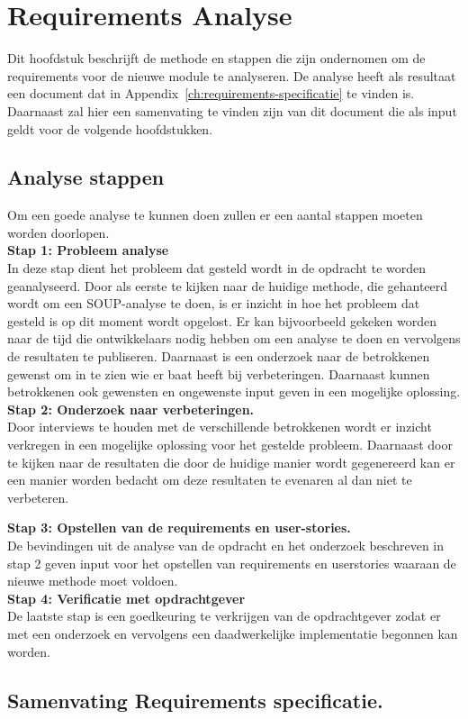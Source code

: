 
\chapter{Requirements Analyse}\label{ch:requirements-analyse}
Dit hoofdstuk beschrijft de methode en stappen die zijn ondernomen om de requirements voor de nieuwe module te analyseren. De analyse heeft als resultaat een document dat in Appendix~\ref{ch:requirements-specificatie} te vinden is. Daarnaast zal hier een samenvating te vinden zijn van dit document die als input geldt voor de volgende hoofdstukken.

\section{Analyse stappen}\label{sec:analyse-stappen}
Om een goede analyse te kunnen doen zullen er een aantal stappen  moeten worden doorlopen.\\
\textbf{Stap 1: Probleem analyse}\\
In deze stap dient het probleem dat gesteld wordt in de opdracht te worden geanalyseerd. Door als eerste te kijken naar de huidige methode, die gehanteerd wordt om een SOUP-analyse te doen, is er inzicht in hoe het probleem dat gesteld is op dit moment wordt opgelost. Er kan bijvoorbeeld gekeken worden naar de tijd die ontwikkelaars nodig hebben om een analyse te doen en vervolgens de resultaten te publiseren. Daarnaast is een onderzoek naar de betrokkenen gewenst om in te zien wie er baat heeft bij verbeteringen. Daarnaast kunnen betrokkenen ook gewensten en ongewenste input geven in een mogelijke oplossing.\\
\textbf{Stap 2: Onderzoek naar verbeteringen.}\\
Door interviews te houden met de verschillende betrokkenen wordt er inzicht verkregen in een mogelijke oplossing voor het gestelde probleem. Daarnaast door te kijken naar de resultaten die door de huidige manier wordt gegenereerd kan er een manier worden bedacht om deze resultaten te evenaren al dan niet te verbeteren.

\textbf{Stap 3: Opstellen van de requirements en user-stories.}\\
De bevindingen uit de analyse van de opdracht en het onderzoek beschreven in stap 2 geven input voor het opstellen van requirements en userstories waaraan de nieuwe methode moet voldoen.\\

\textbf{Stap 4: Verificatie met opdrachtgever}\\
De laatste stap is een goedkeuring te verkrijgen van de opdrachtgever zodat er met een onderzoek en vervolgens een daadwerkelijke implementatie begonnen kan worden.\\

\section{Samenvating Requirements specificatie.}\label{sec:samenvating-requirements-specificatie.}


